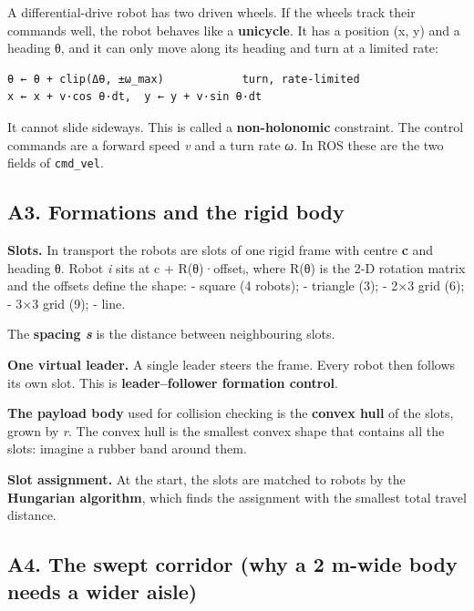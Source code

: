 \documentclass[
  10.5pt,
  a4paper,
]{article}
\begin{document}
A differential-drive robot has two driven wheels. If the wheels track
their commands well, the robot behaves like a \textbf{unicycle}. It has
a position (x, y) and a heading θ, and it can only move along its
heading and turn at a limited rate:

\begin{verbatim}
θ ← θ + clip(Δθ, ±ω_max)            turn, rate-limited
x ← x + v·cos θ·dt,  y ← y + v·sin θ·dt
\end{verbatim}

It cannot slide sideways. This is called a \textbf{non-holonomic}
constraint. The control commands are a forward speed \emph{v} and a turn
rate \emph{ω}. In ROS these are the two fields of \texttt{cmd\_vel}.

\hypertarget{a3.-formations-and-the-rigid-body}{%
\subsection{A3. Formations and the rigid
body}\label{a3.-formations-and-the-rigid-body}}

\textbf{Slots.} In transport the robots are slots of one rigid frame
with centre \textbf{c} and heading θ. Robot \emph{i} sits at c +
R(θ)·offsetᵢ, where R(θ) is the 2-D rotation matrix and the offsets
define the shape: - square (4 robots); - triangle (3); - 2×3 grid (6); -
3×3 grid (9); - line.

The \textbf{spacing \emph{s}} is the distance between neighbouring
slots.

\textbf{One virtual leader.} A single leader steers the frame. Every
robot then follows its own slot. This is \textbf{leader--follower
formation control}.

\textbf{The payload body} used for collision checking is the
\textbf{convex hull} of the slots, grown by \emph{r}. The convex hull is
the smallest convex shape that contains all the slots: imagine a rubber
band around them.

\textbf{Slot assignment.} At the start, the slots are matched to robots
by the \textbf{Hungarian algorithm}, which finds the assignment with the
smallest total travel distance.

\hypertarget{a4.-the-swept-corridor-why-a-2-m-wide-body-needs-a-wider-aisle}{%
\subsection{A4. The swept corridor (why a 2 m-wide body needs a wider
aisle)}\label{a4.-the-swept-corridor-why-a-2-m-wide-body-needs-a-wider-aisle}}
\end{document}
